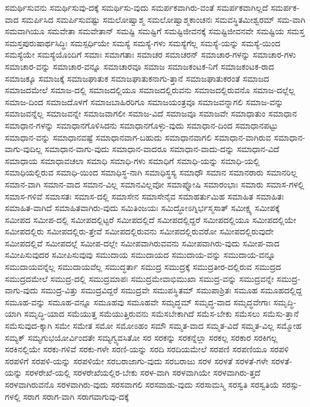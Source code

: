 {ಸಮರ್ಥಿಸುವನು
ಸಮರ್ಥಿಸುವು-ದಕ್ಕೆ
ಸಮರ್ಥಿಸು-ವುದು
ಸಮರ್ಪಕವಾಗಿರು-ವಂತೆ
ಸಮರ್ಪಕವಾಗಿಲ್ಲದೆ
ಸಮರ್ಪಕ-ವಾದ
ಸಮರ್ಪಿಸಿದ
ಸಮರ್ಪಿಸುವಷ್ಟು
ಸಮಲೋಷ್ವಾಶ್ಮ
ಸಮಲೋಷ್ವಾಶ್ಮಕಾಂಚನಃ
ಸಮವಸ್ಥಿತಮೀಶ್ವರಮ್
ಸಮ-ವಾಗಿ
ಸಮವಾಗಿಯೂ
ಸಮವೇತಾ
ಸಮವೇತಾನ್
ಸಮಷ್ಟಿ
ಸಮಷ್ಟಿಗೆ
ಸಮಷ್ಟಿಜೀವನಕ್ಕೆ
ಸಮಷ್ಟಿಜೀವನವೇ
ಸಮಷ್ಟಿಯ
ಸಮಸ್ತ
ಸಮಸ್ತಪುರುಷಾರ್ಥಸಿದ್ಧಿಃ
ಸಮಸ್ಪರ್ಧಿಯೇ
ಸಮಸ್ಯೆ
ಸಮಸ್ಯೆ-ಗಳು
ಸಮಸ್ಯೆಗೆಲ್ಲ
ಸಮಸ್ಯೆ-ಯನ್ನು
ಸಮಸ್ಯೆ-ಯಿಂದ
ಸಮಸ್ಯೆಯೇ
ಸಮಸ್ಯೆಯೊಂದಿಗೆ
ಸಮಾಃ
ಸಮಾಗತಾಃ
ಸಮಾಚರ
ಸಮಾಚರನ್
ಸಮಾಚಾರ-ಗಳನ್ನು
ಸಮಾಚಾರ-ಗಳು
ಸಮಾಚಾರ-ವನ್ನು
ಸಮಾಚಾರ-ವನ್ನೂ
ಸಮಾಚಾರವೂ
ಸಮಾಜ
ಸಮಾಜಕಂಟಕ-ನಿಗೆ
ಸಮಾಜಕಂಟಕ-ರಾದ
ಸಮಾಜಕ್ಕೂ
ಸಮಾಜಕ್ಕೆ
ಸಮಾಜಘಾತುಕ
ಸಮಾಜಘಾತುಕನಾಗು-ತ್ತಾನೆ
ಸಮಾಜಘಾತುಕರಂತೆ
ಸಮಾಜದ
ಸಮಾಜದಮೇಲೆ
ಸಮಾಜ-ದಲ್ಲಿ
ಸಮಾಜದಲ್ಲಿಯೂ
ಸಮಾಜದಲ್ಲಿರುವನು
ಸಮಾಜದಲ್ಲಿರುವನೊ
ಸಮಾಜ-ದಲ್ಲೆಲ್ಲ
ಸಮಾಜ-ದಿಂದ
ಸಮಾಜದೊಳಗೆ
ಸಮಾಜಬಾಹಿರರಿಗೂ
ಸಮಾಜಯಂತ್ರವೂ
ಸಮಾಜವನ್ನಾಗಲಿ
ಸಮಾಜ-ವನ್ನು
ಸಮಾಜವನ್ನೆಲ್ಲ
ಸಮಾಜವನ್ನೇ
ಸಮಾಜವಾಗಲೀ
ಸಮಾಜ-ವಿದೆ
ಸಮಾಜವೂ
ಸಮಾಜವೇ
ಸಮಾಧಾತುಂ
ಸಮಾಧಾನ
ಸಮಾಧಾನ-ಗಳನ್ನು
ಸಮಾಧಾನಗೊಳಿಸಿದನು
ಸಮಾಧಾನಗೊಳ್ಳು-ವುದು
ಸಮಾಧಾನ-ದಿಂದ
ಸಮಾಧಾನಪಟ್ಟು
ಸಮಾಧಾನ-ವನ್ನು
ಸಮಾಧಾನವಷ್ಟೆ
ಸಮಾಧಾನವಾಗ-ಬಹುದು
ಸಮಾಧಾನವಾಗಲಿ
ಸಮಾಧಾನ-ವಾಗಿರುವ
ಸಮಾಧಾನ-ವಾಗು-ವುದಿಲ್ಲ
ಸಮಾಧಾನ-ವಾಗು-ವುದು
ಸಮಾಧಾನ-ವಾದರೂ
ಸಮಾಧಾನ-ವಾದು-ದನ್ನು
ಸಮಾಧಾನ-ವಿದೆ
ಸಮಾಧಾಯ
ಸಮಾಧಾವಚಲಾ
ಸಮಾಧಿ
ಸಮಾಧಿ-ಗಳು
ಸಮಾಧಿಗೆ
ಸಮಾಧಿ-ಯನ್ನು
ಸಮಾಧಿ-ಯಲ್ಲಿ
ಸಮಾಧಿಯಲ್ಲಿರುವ
ಸಮಾಧಿ-ಯಿಂದ
ಸಮಾಧಿಸ್ಥ-ನಾಗಿ
ಸಮಾಧಿಸ್ಥಸ್ಯ
ಸಮಾಧೌ
ಸಮಾನ
ಸಮಾನರಾರು
ಸಮಾನರಿಲ್ಲ
ಸಮಾನ-ವಾಗಿ
ಸಮಾನ-ವಾದ
ಸಮಾನ-ವಿಲ್ಲ
ಸಮಾನವಿಲ್ಲವೋ
ಸಮಾಪ್ನೋಷಿ
ಸಮಾರಂಭಾಃ
ಸಮಾರು
ಸಮಾಸ-ಗಳಲ್ಲಿ
ಸಮಾಸ-ಗಳಿವೆ
ಸಮಾಸತಃ
ಸಮಾಸ-ದಲ್ಲಿ
ಸಮಾಸೇನ
ಸಮಾಸೇನೈವ
ಸಮಾಹರ್ತುಮಿಹ
ಸಮಾಹಿತ
ಸಮಾಹಿತಃ
ಸಮಾಹಿತ-ವಾಗಿದೆ
ಸಮಾಹಿತವಾಗಿರು-ವುದು
ಸಮಿತಿಂಜಯಃ
ಸಮಿದ್ಧೋಽಗ್ನಿರ್ಭಸ್ಮಸಾತ್
ಸಮೀಕ್ಷ್ಯ
ಸಮೀಪಕ್ಕೆ
ಸಮೀಪದ
ಸಮೀಪ-ದಲ್ಲಿ
ಸಮೀಪದಲ್ಲಿಟ್ಟರೆ
ಸಮೀಪದಲ್ಲಿದೆ
ಸಮೀಪದಲ್ಲಿದ್ದರೆ
ಸಮೀಪದಲ್ಲಿಯೂ
ಸಮೀಪದಲ್ಲಿಯೇ
ಸಮೀಪದಲ್ಲಿರು
ಸಮೀಪದಲ್ಲಿರು-ತ್ತೇವೆ
ಸಮೀಪದಲ್ಲಿರುವನು
ಸಮೀಪದಲ್ಲಿರುವರೋ
ಸಮೀಪದಲ್ಲಿರುವುದೇ
ಸಮೀಪದಲ್ಲಿವೆ
ಸಮೀಪದಲ್ಲೆ
ಸಮೀಪ-ದಲ್ಲೇ
ಸಮೀಪವಾಗಿರುವವನು
ಸಮೀಪವಾಗಿರು-ವುದು
ಸಮೀಪ-ವಾದ
ಸಮೀಪಿಸುವುದರ
ಸಮೀಪಿಸುವುವು
ಸಮುದಾಯ
ಸಮುದಾಯದ
ಸಮುದಾಯ-ವನ್ನು
ಸಮುದಾಯ-ವನ್ನೂ
ಸಮುದಾಯವನ್ನೆಲ್ಲ
ಸಮುದಾಯವೆಲ್ಲ
ಸಮುದ್ಧರ್ತಾ
ಸಮುದ್ರ
ಸಮುದ್ರಕ್ಕೆ
ಸಮುದ್ರತೀರ-ದಲ್ಲಿರುವ
ಸಮುದ್ರದ
ಸಮುದ್ರದಮೇಲೆ
ಸಮುದ್ರ-ದಲ್ಲಿ
ಸಮುದ್ರಮಾಪಃ
ಸಮುದ್ರಮೇವಾಭಿಮುಖಾ
ಸಮುದ್ರ-ವನ್ನು
ಸಮುದ್ರವನ್ನೇ
ಸಮುದ್ರ-ವಾಗು-ವುದು
ಸಮುದ್ರ-ವಿತ್ತು
ಸಮುದ್ರವಿದ್ದರೆ
ಸಮುದ್ರವೇ
ಸಮುಪಸ್ಥಿತಮ್
ಸಮುಪಾಶ್ರಿತಃ
ಸಮೂಹ
ಸಮೂಹದಲ್ಲಿದ್ದ
ಸಮೂಹ-ವನ್ನು
ಸಮೂಹ-ವನ್ನೂ
ಸಮೂಹವು
ಸಮೂಹವೇ
ಸಮೃದ್ಧಮ್
ಸಮೃದ್ಧ-ವಾದ
ಸಮೃದ್ಧವೇಗಾಃ
ಸಮೃದ್ಧಿ-ಯಾಗಿ
ಸಮೃದ್ಧಿ-ಯಾದ
ಸಮೆಯುತ್ತ
ಸಮೆಯುತ್ತಿರುವನು
ಸಮೆಸಬೇಕಾಗಿದೆ
ಸಮೆಸ-ಬೇಕು
ಸಮೆಸಲು
ಸಮೆಸು-ತ್ತಾನೆ
ಸಮೆಸುವುದ-ಕ್ಕಾಗಿ
ಸಮೇ
ಸಮೇತ
ಸಮೋ
ಸಮೋಽಹಂ
ಸಮೌ
ಸಮ್ಮತ-ವಾದ
ಸಮ್ಮತ-ವಿದೆ
ಸಮ್ಮತ-ವಿಲ್ಲ
ಸಮ್ಮೋಹ
ಸಮ್ಯಕ್
ಸಮ್ಯಗುಭಯೋರ್ವಿಂದತೇ
ಸಮ್ಯಗ್ವ್ಯವಸಿತೋ
ಸರ
ಸರಕನ್ನು
ಸರಕನ್ನೆಲ್ಲಾ
ಸರಕಲ್ಲ
ಸರಕಾರ
ಸರಕಿಗಲ್ಲ
ಸರಕಿನಲ್ಲಿಯೇ
ಸರಕು-ಗಳಿವೆ
ಸರಕು-ಗಳೇ
ಸರಣಿ-ಯನ್ನು
ಸರದಿ
ಸರದಿಯಮೇಲೆ
ಸರಪಣಿ
ಸರಪಣಿಯೂ
ಸರಪಳಿ
ಸರಪಳಿಗೆ
ಸರಪಳಿ-ಯನ್ನು
ಸರಪಳಿಯೇ
ಸರಬರಾಜಾಗು-ವುದು
ಸರಬರಾಜು
ಸರಳ
ಸರಳತೆ
ಸರಳತೆ-ಗಳೇ
ಸರಳತೆ-ಯನ್ನು
ಸರಳರೇಖೆ-ಯಲ್ಲಿ
ಸರಳರೇಖೆಯಲ್ಲಿರ-ಬೇಕು
ಸರಳ-ವಾಗಿ
ಸರಳವಾಗಿಯೇ
ಸರಳವಾಗಿರು-ತ್ತದೆ
ಸರಳವಾಗಿರುವನೊ
ಸರಳವಾಗಿರು-ವುದು
ಸರಸವಾಗಲಿ
ಸರಸವಾಡು-ವುದು
ಸರಸಾಮಸ್ಮಿ
ಸರಸ್ವತಿ
ಸರಸ್ವತಿಯೆ
ಸರಸ್ಸು-ಗಳಲ್ಲಿ
ಸರಾಗ
ಸರಾಗ-ವಾಗಿ
ಸರಾಗವಾಗುವು-ದಕ್ಕೆ
}
